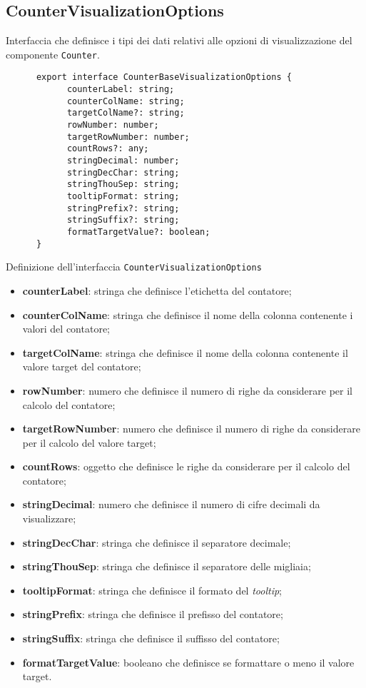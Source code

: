 \subsection{CounterVisualizationOptions}
Interfaccia che definisce i tipi dei dati relativi alle opzioni di visualizzazione del componente \texttt{Counter}.
\begin{listing}[H]
      \begin{verbatim}
      export interface CounterBaseVisualizationOptions {
            counterLabel: string;
            counterColName: string;
            targetColName?: string;
            rowNumber: number;
            targetRowNumber: number;
            countRows?: any;
            stringDecimal: number;
            stringDecChar: string;
            stringThouSep: string;
            tooltipFormat: string;
            stringPrefix?: string;
            stringSuffix?: string;
            formatTargetValue?: boolean;
      }
      \end{verbatim}
      \caption{Definizione dell'interfaccia \texttt{CounterVisualizationOptions}}
      \label{listing:counterVisualizationOptions}
\end{listing}
\begin{itemize}
      \item \textbf{counterLabel}: stringa che definisce l'etichetta del contatore;
      \item \textbf{counterColName}: stringa che definisce il nome della colonna contenente i valori del contatore;
      \item \textbf{targetColName}: stringa che definisce il nome della colonna contenente il valore target del contatore;
      \item \textbf{rowNumber}: numero che definisce il numero di righe da considerare per il calcolo del contatore;
      \item \textbf{targetRowNumber}: numero che definisce il numero di righe da considerare per il calcolo del valore target;
      \item \textbf{countRows}: oggetto che definisce le righe da considerare per il calcolo del contatore;
      \item \textbf{stringDecimal}: numero che definisce il numero di cifre decimali da visualizzare;
      \item \textbf{stringDecChar}: stringa che definisce il separatore decimale;
      \item \textbf{stringThouSep}: stringa che definisce il separatore delle migliaia;
      \item \textbf{tooltipFormat}: stringa che definisce il formato del \textit{tooltip};
      \item \textbf{stringPrefix}: stringa che definisce il prefisso del contatore;
      \item \textbf{stringSuffix}: stringa che definisce il suffisso del contatore;
      \item \textbf{formatTargetValue}: booleano che definisce se formattare o meno il valore target.
\end{itemize}

